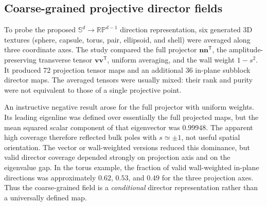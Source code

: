 \documentclass[11pt,a4paper]{article}
\newcommand{\nn}{\bm n}
\newcommand{\vv}{\bm v}
\newcommand{\RP}{\mathbb{RP}}
\newcommand{\Sn}{\mathbb S}
\begin{document}
\subsection{Coarse-grained projective director fields}\label{subsec:impl:rp}
To probe the proposed \(\Sn^d\rightarrow\RP^{d-1}\) direction representation, six generated 3D textures (sphere, capsule, torus, pair, ellipsoid, and shell) were averaged along three coordinate axes. The study compared the full projector \(\nn\nn^{\mathsf T}\), the amplitude-preserving transverse tensor \(\vv\vv^{\mathsf T}\), uniform averaging, and the wall weight \(1-s^2\). It produced 72 projection tensor maps and an additional 36 in-plane subblock director maps. The averaged tensors were usually mixed: their rank and purity were not equivalent to those of a single projective point.

An instructive negative result arose for the full projector with uniform weights. Its leading eigenline was defined over essentially the full projected maps, but the mean squared scalar component of that eigenvector was \(0.99948\). The apparent high coverage therefore reflected bulk poles with \(s\simeq\pm1\), not useful spatial orientation. The vector or wall-weighted versions reduced this dominance, but valid director coverage depended strongly on projection axis and on the eigenvalue gap. In the torus example, the fraction of valid wall-weighted in-plane directions was approximately \(0.62\), \(0.53\), and \(0.49\) for the three projection axes. Thus the coarse-grained field is a \emph{conditional} director representation rather than a universally defined map.
\end{document}
